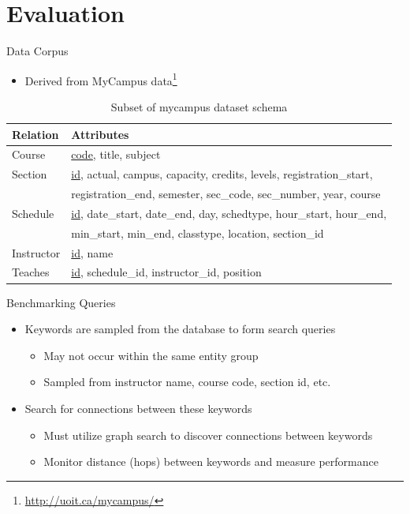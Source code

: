 \documentclass[compress]{beamer}
\begin{document}
	\section{Evaluation}
		\begin{frame}{Data Corpus}
			\begin{itemize}
				\item Derived from MyCampus data\footnote{\url{http://uoit.ca/mycampus/}}
			\end{itemize}
			
			\begin{footnotesize}
				\begin{table}
					\centering
					
					\begin{tabular}{ll}
						\toprule
						Relation & Attributes \\
						\midrule
						Course & \underline{code}, title, subject \\
						Section & \underline{id}, actual, campus, capacity, credits, levels, registration\_start, \\
						 & registration\_end, semester, sec\_code, sec\_number, year, course \\
						Schedule & \underline{id}, date\_start, date\_end, day, schedtype, hour\_start, hour\_end, \\
						 & min\_start, min\_end, classtype, location, section\_id \\
						Instructor & \underline{id}, name \\
						Teaches & \underline{id}, schedule\_id, instructor\_id, position \\
						\bottomrule
					\end{tabular}
					
					\caption{Subset of mycampus dataset schema}
					\label{tbl:schema}
				\end{table}
			\end{footnotesize}
		\end{frame}
		
		\begin{frame}{Benchmarking Queries}
			\begin{itemize}
				\item Keywords are sampled from the database to form search queries
					\begin{itemize}
						\item May not occur within the same entity group
						\item Sampled from instructor name, course code, section id, etc.
					\end{itemize}
				\item Search for connections between these keywords
					\begin{itemize}
						\item Must utilize graph search to discover connections between keywords
						\item Monitor distance (hops) between keywords and measure performance
					\end{itemize}
			\end{itemize}
		\end{frame}
		
\end{document}
